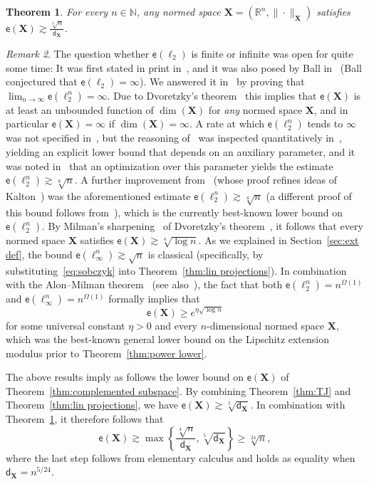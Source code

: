\documentclass[11pt,reqno]{amsart}
\renewcommand{\ge}{\geqslant}
\newcommand{\dd}{\mathsf{d}}
\newcommand{\X}{\mathbf X}
\newcommand{\R}{\mathbb R}
\newtheorem{theorem}{Theorem}
\theoremstyle{remark}
\newtheorem{remark}[theorem]{Remark}
\newcommand{\N}{\mathbb N}
\newcommand{\ee}{\mathsf{e}}
\renewcommand{\1}{\mathbf 1}
\begin{document}
\begin{theorem}\label{thm:MN} For every $n\in \N$, any normed space $\X=(\R^n,\|\cdot\|_{\X})$ satisfies
 $\ee(\X)\gtrsim\frac{\sqrt[4]{n}}{\dd_{\X}}$.
\end{theorem}


\begin{remark}\label{rem:history lower ext hilbert} The question whether $\ee(\ell_2)$ is finite or infinite was open for quite some time: It was first stated in print  in~\cite[page~137]{JLS86}, and it was also posed by Ball in~\cite[page~170]{Bal92} (Ball conjectured  that $\ee(\ell_2)=\infty$). We answered it  in~\cite{Nao01} by proving  that $\lim_{n\to \infty} \ee(\ell_2^n)=\infty$. Due to Dvoretzky's theorem~\cite{Dvo60} this  implies that $\ee(\X)$ is at least an unbounded function of $\dim(\X)$ for {\em any} normed space $\X$, and in particular $\ee(\X)=\infty$ if $\dim(\X)=\infty$. A rate at which $\ee(\ell_2^n)$ tends to $\infty$ was not specified in~\cite{Nao01}, but the reasoning of~\cite{Nao01} was inspected quantitatively in~\cite[Remark~5.3]{LN05}, yielding an explicit lower bound  that depends on an auxiliary parameter, and it was noted in~\cite{BB07-2} that an optimization over this  parameter yields the estimate $\ee(\ell_2^n)\gtrsim \sqrt[8]{n}$. A further improvement from~\cite{MN13-bary} (whose proof refines ideas of Kalton~\cite{Kal04,Kal12}) was  the aforementioned estimate $\ee(\ell_2^n)\gtrsim \sqrt[4]{n}$ (a different proof of this bound  follows from~\cite{Nao20-almost}), which is the currently best-known lower bound on $\ee(\ell_2^n)$. By Milman's sharpening~\cite{Mil71}  of Dvoretzky's theorem~\cite{Dvo60}, it follows  that every normed space $\X$ satisfies $\ee(\X)\gtrsim \sqrt[4]{\log n}$. As we explained in Section~\ref{sec:ext def}, the bound $\ee(\ell_\infty^n)\gtrsim \sqrt{n}$ is classical (specifically, by substituting~\eqref{eq:sobczyk} into Theorem~\ref{thm:lin projections}). In combination with the Alon--Milman theorem~\cite{AM83} (see also~\cite{Tal95}), the fact that both $\ee(\ell_2^n)=n^{\Omega(1)}$ and $ \ee(\ell_\infty^n)=n^{\Omega(1)}$ formally implies that  $$\ee(\X)\ge e^{\eta \sqrt{\log n}}$$
for some universal constant $\eta>0$ and every $n$-dimensional normed space $\X$, which was the best-known general lower bound on the Lipschitz extension modulus  prior to Theorem~\ref{thm:power lower}.
\end{remark}

The above results imply as follows the lower bound on $\ee(\X)$ of Theorem~\ref{thm:complemented subspace}. By combining Theorem~\ref{thm:TJ} and Theorem~\ref{thm:lin projections}, we have $\ee(\X)\gtrsim \sqrt[5]{\dd_{\X}}$. In combination with Theorem~\ref{thm:MN}, it therefore follows that
\begin{equation}\label{eq:1/24}
\ee(\X)\gtrsim \max \left\{\frac{\sqrt[4]{n}}{\dd_{\X}},\sqrt[5]{\dd_{\X}}\right\}\ge \sqrt[24]{n},
\end{equation}
where the last step follows from elementary calculus and holds as equality when $\dd_\X=n^{5/24}$.
\end{document}
